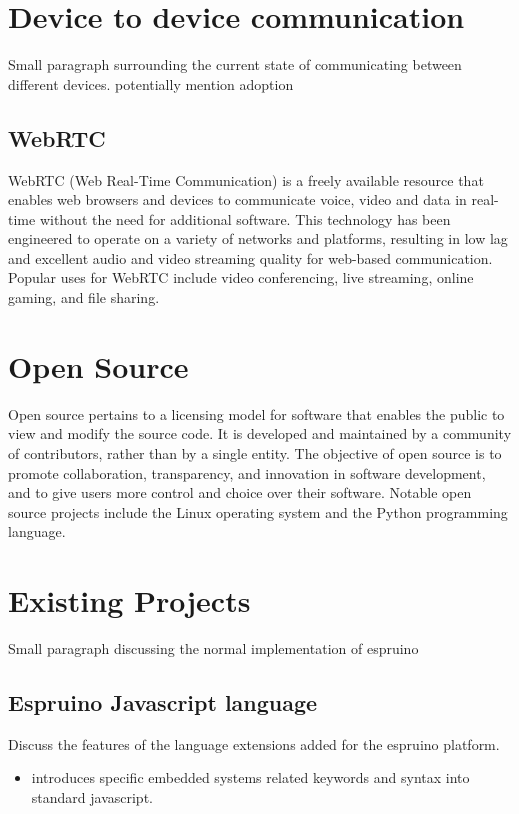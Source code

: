 \documentclass{l4proj}
\begin{document}
\section{Device to device communication}

Small paragraph surrounding the current state of communicating between different devices. potentially mention adoption 

\subsection{WebRTC}
\text WebRTC (Web Real-Time Communication) is a freely available resource that enables web browsers and devices to communicate voice, video and data in real-time without the need for additional software. This technology has been engineered to operate on a variety of networks and platforms, resulting in low lag and excellent audio and video streaming quality for web-based communication. Popular uses for WebRTC include video conferencing, live streaming, online gaming, and file sharing.

\section{Open Source}
\text Open source pertains to a licensing model for software that enables the public to view and modify the source code. It is developed and maintained by a community of contributors, rather than by a single entity. The objective of open source is to promote collaboration, transparency, and innovation in software development, and to give users more control and choice over their software. Notable open source projects include the Linux operating system and the Python programming language.

\section{Existing Projects}
\text Small paragraph discussing the normal implementation of espruino

\subsection{Espruino Javascript language}
Discuss the features of the language extensions added for the espruino platform.
\begin{itemize}
    \item introduces specific embedded systems related keywords and syntax into standard javascript.
\end{itemize}
\end{document}
